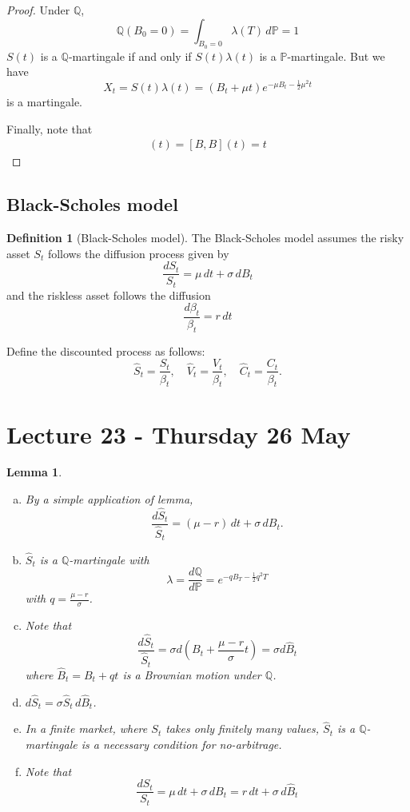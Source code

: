 \documentclass[10pt, oneside, reqno]{amsart}
\theoremstyle{plain}%
\newtheorem{lem}[thm]{Lemma}
\theoremstyle{definition}
\newtheorem{defn}[thm]{Definition}
\theoremstyle{remark}
\newcommand{\Q}{\mathbb{Q}}
\renewcommand{\P}{\mathbb{P}}
\begin{document}
\begin{proof}
    Under $\Q$, \[
        \Q(B_0 = 0) = \int_{B_0 = 0} \lambda(T) \, d\P = 1
    \]  $S(t)$ is a $\Q$-martingale if and only if $S(t) \lambda(t)$ is a $\P$-martingale.  But we have \[
        X_t = S(t) \lambda(t) = \left( B_t + \mu t \right) e^{- \mu B_t - \frac{1}{2} \mu^2 t}
    \] is a martingale.  
    
    Finally, note that \begin{align*}
        [S, S](t) = [ B, B](t) = t
    \end{align*}
\end{proof}

\subsection{Black-Scholes model} %
\label{sub:black_scholes_model}
\begin{defn}[Black-Scholes model]
    The Black-Scholes model assumes the risky asset $S_t$ follows the diffusion process given by \[
        \frac{dS_t}{S_t} = \mu \, dt + \sigma \, dB_t
    \] and the riskless asset follows the diffusion \[
        \frac{d\beta_t}{\beta_t} = r \, dt
    \]
    
Define the discounted process as follows:\[
    \hat S_t = \frac{S_t}{\beta_t}, \quad \hat V_t = \frac{V_t}{\beta_t}, \quad \hat C_t = \frac{C_t}{\beta_t}.
\]  
\end{defn}



\section{Lecture 23 - Thursday 26 May} %
\label{sec:lecture_23_thursday_26_may}

\begin{lem}{\ }
    \begin{enumerate}[(a)]
    \item By a simple application of \itos lemma, \[
        \frac{d\hat S_t}{\hat S_t} = (\mu - r) \, dt + \sigma \, dB_t.
    \]
    \item $\hat S_t$ is a $\Q$-martingale with \[
        \lambda = \frac{d \Q}{d \P} = e^{- q B_T - \frac{1}{2} q^2 T}
    \] with $ q = \frac{\mu - r}{\sigma}$.  
    
    \item Note that \[
        \frac{d \hat S_t}{\hat S_t} = \sigma d(B_t + \frac{\mu - r}{\sigma} t) = \sigma d \hat B_t
    \] where $\hat B_t = B_t + qt$ is a Brownian motion under $\Q$.  
    
    \item $d\hat S_t = \sigma \hat S_t \, d \hat B_t$.  
    \item In a finite market, where $S_t$ takes only finitely many values, $\hat S_t$ is a $\Q$-martingale is a necessary condition for no-arbitrage.
    \item Note that \[
        \frac{dS_t}{S_t} = \mu \, dt + \sigma \, dB_t = r \, dt + \sigma \, d \hat B_t
    \] 
    \end{enumerate}  
\end{lem}
\end{document}
